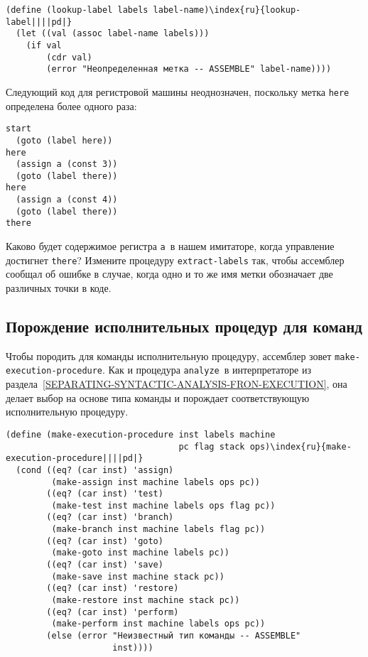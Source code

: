 \begin{Verbatim}[fontsize=\small]
(define (lookup-label labels label-name)\index{ru}{lookup-label||||pd|}
  (let ((val (assoc label-name labels)))
    (if val
        (cdr val)
        (error "Неопределенная метка -- ASSEMBLE" label-name))))
\end{Verbatim}
\begin{exercise}{5.8}%
\label{EX5.8}%
Следующий код для регистровой машины неоднозначен,
поскольку метка {\tt here} определена более одного раза:

\begin{Verbatim}[fontsize=\small]
start
  (goto (label here))
here
  (assign a (const 3))
  (goto (label there))
here
  (assign a (const 4))
  (goto (label there))
there
\end{Verbatim}
Каково будет содержимое регистра {\tt a}~в нашем имитаторе,
когда управление достигнет {\tt there}?  Измените процедуру
{\tt extract-labels} так, чтобы ассемблер сообщал об ошибке в
случае, когда одно и то же имя метки обозначает две различных точки в
коде.
\end{exercise}

\subsection{Порождение исполнительных процедур для команд}
\label{GENERATING-EXECUTION-PROCEDURES-FOR-INSTRUCTIONS}


Чтобы породить для команды исполнительную процедуру,
ассемблер зовет {\tt make-execution-procedure}. Как и процедура
{\tt analyze}~в интерпретаторе из 
раздела~\ref{SEPARATING-SYNTACTIC-ANALYSIS-FRON-EXECUTION}, она
делает выбор на основе типа команды и порождает соответствующую
исполнительную процедуру.

\begin{Verbatim}[fontsize=\small]
(define (make-execution-procedure inst labels machine
                                  pc flag stack ops)\index{ru}{make-execution-procedure||||pd|}
  (cond ((eq? (car inst) 'assign)
         (make-assign inst machine labels ops pc))
        ((eq? (car inst) 'test)
         (make-test inst machine labels ops flag pc))
        ((eq? (car inst) 'branch)
         (make-branch inst machine labels flag pc))
        ((eq? (car inst) 'goto)
         (make-goto inst machine labels pc))
        ((eq? (car inst) 'save)
         (make-save inst machine stack pc))
        ((eq? (car inst) 'restore)
         (make-restore inst machine stack pc))
        ((eq? (car inst) 'perform)
         (make-perform inst machine labels ops pc))
        (else (error "Неизвестный тип команды -- ASSEMBLE"
                     inst))))
\end{Verbatim}

